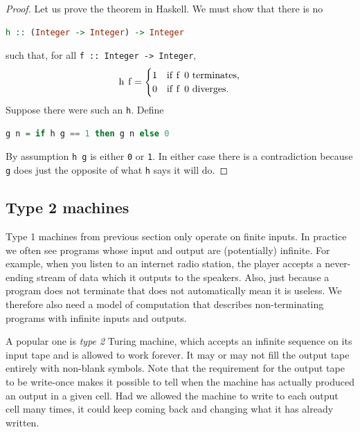 \begin{proof}
  Let us prove the theorem in Haskell. We must show that there is no
  \begin{lstlisting}[language=Haskell]
h :: (Integer -> Integer) -> Integer
  \end{lstlisting}
  such that, for all \lstinline!f :: Integer -> Integer!,
  \begin{equation*}
    \text{\lstinline!h f!} =
    \begin{cases}
      \text{\lstinline!1!} & \text{if \lstinline!f 0! terminates,}\\
      \text{\lstinline!0!} & \text{if \lstinline!f 0! diverges.}
    \end{cases}
  \end{equation*}
  Suppose there were such an \lstinline!h!. Define
  \begin{lstlisting}[language=Haskell]
g n = if h g == 1 then g n else 0
  \end{lstlisting}
  By assumption \lstinline!h g! is either \lstinline!0! or
  \lstinline!1!. In either case there is a contradiction because
  \lstinline!g! does just the opposite of what \lstinline!h! says it
  will do.
\end{proof}


\subsection{Type 2 machines}
\label{sec:type-2}

Type 1 machines from previous section only operate on finite inputs.
In practice we often see programs whose input and output are
(potentially) infinite. For example, when you listen to an internet
radio station, the player accepts a never-ending stream of data which
it outputs to the speakers. Also, just because a program does not
terminate that does not automatically mean it is useless. We therefore
also need a model of computation that describes non-terminating
programs with infinite inputs and outputs.

A popular one is \emph{type 2} Turing machine, which accepts an
infinite sequence on its input tape and is allowed to work forever. It
may or may not fill the output tape entirely with non-blank symbols.
Note that the requirement for the output tape to be write-once makes
it possible to tell when the machine has actually produced an output
in a given cell. Had we allowed the machine to write to each output
cell many times, it could keep coming back and changing what it has
already written.

